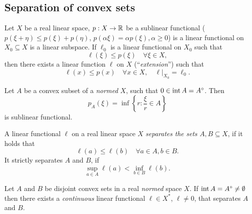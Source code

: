 \documentclass[../skript.tex]{subfiles}
\begin{document}
\subsection*{Separation of convex sets}
\begin{theoremnonumb} %
Let $X$ be a real linear space, $p : X \to \mathbb{R}$ be a sublinear functional ($p(\xi + \eta) \leq p(\xi) + p(\eta)$, $p(\alpha \xi) = \alpha p(\xi), \alpha \geq 0$) is a linear functional on $X_0 \subseteq X$ is a linear subspace. If $\ell_0$ is a linear functional on $X_0$ such that 
\[
	\ell(\xi) \leq p(\xi) \quad \forall \xi \in X,
\]
then there exists a linear function $\ell$ on $X$ (``\emph{extension}'') such that
\[
	\ell(x) \leq p(x) \quad \forall x \in X, \quad \ell|_{X_0} = \ell_0.
\]
\end{theoremnonumb}
\begin{definitionnonumb} %
Let $A$ be a convex subset of a \emph{normed} $X$, such that $0 \in \operatorname{int} A = A^\circ$. Then
\[
	p_A(\xi) = \inf \left\{ r : \frac{\xi}{r} \in A \right\}
\]
is sublinear functional.
\end{definitionnonumb}
\begin{definition} %
\label{def:c1e6}
A linear functional $\ell$ on a real linear space $X$ \emph{separates the sets $A, B \subseteq X$}, if it holds that
\[
	\ell(a) \leq \ell(b) \quad \forall a \in A, b \in B.
\]
It strictly separates $A$ and $B$, if
\[
	\sup_{a \in A} \ell(a) < \inf_{b \in B} \ell(b).
\]
\end{definition}
\begin{theorem} %
\label{thm:c1e7}
Let $A$ and $B$ be disjoint convex sets in a real \emph{normed} space $X$. If $\operatorname{int} A = A^\circ \neq \emptyset$ then there exists a \emph{continuous} linear functional $\ell \in X^*$, $\ell \neq 0$, that separates $A$ and $B$.
\end{theorem}
\end{document}
